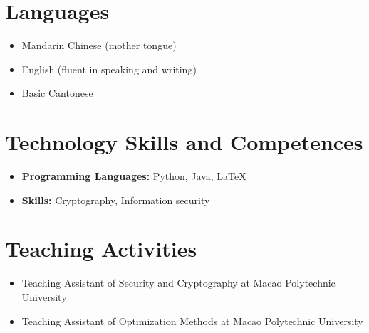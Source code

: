 \documentclass[a4paper,12pt]{article}
\begin{document}
\section*{Languages}
\begin{itemize}[left=0pt, label=\textbullet]
    \item Mandarin Chinese (mother tongue)
    \item English (fluent in speaking and writing)
    \item Basic Cantonese
\end{itemize}

\section*{Technology Skills and Competences}
\begin{itemize}[left=0pt, label={}]
    \item \textbf{Programming Languages:} Python, Java, \LaTeX
    \item \textbf{Skills:} Cryptography, Information security
\end{itemize}

\section*{Teaching Activities}
\begin{itemize}[left=0pt, label=\textbullet]
    \item Teaching Assistant of Security and Cryptography at Macao Polytechnic University 
    \item Teaching Assistant of Optimization Methods at Macao Polytechnic University
\end{itemize}
\end{document}
